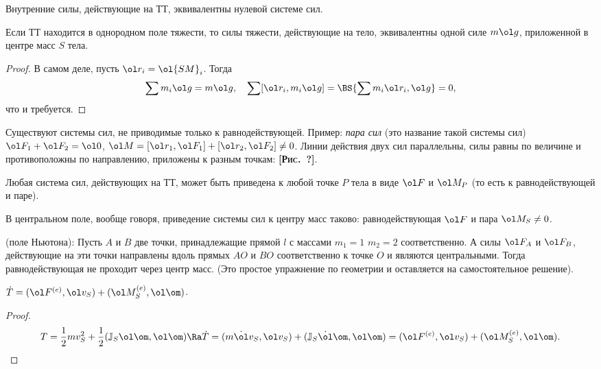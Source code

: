\documentclass[a4paper,12pt]{article}
\def\F{\ol F}
\def\w{\ol\om}
\def\r{\ol r}
\def\v{\ol v}
\def\JS{{\mathbb{J}_S}}
\def\d{\dot}
\def\pic#1{ \hbox{\textbf{\textsc{[Рис.~#1]}}}}
\begin{document}
\begin{note}
Внутренние силы, действующие на ТТ, эквивалентны нулевой системе сил.
\end{note}

\begin{lemma}
Если ТТ находится в однородном поле тяжести, то силы тяжести,
действующие на тело, эквивалентны одной силе $m\ol g$, приложенной в центре
масс $S$ тела.
\end{lemma}
\begin{proof}
В самом деле, пусть $\r_i=\ol{SM}_i$. Тогда
$$\sum m_i\ol g=m\ol g, \quad \sum[\r_i,m_i\ol g]= \BS{\sum m_i\r_i,\ol g} = 0,$$
что и требуется.
\end{proof}

\begin{note}
Существуют системы сил, не приводимые только к равнодействующей.
Пример: \emph{пара сил} (это название такой системы сил)
$\F_1+\F_2=\ol0$, $\ol M=[\r_1,\F_1]+[\r_2,\F_2]\ne0$.
Линии действия двух сил параллельны, силы равны по величине и
противоположны по направлению, приложены к разным точкам: \pic{?}.
\end{note}

\begin{note}
Любая система сил, действующих на ТТ, может быть приведена к
любой точке $P$ тела в виде $\F$ и $\ol M_P$ (то есть к равнодействующей и паре).
\end{note}

\begin{note}
В центральном поле, вообще говоря, приведение системы сил к
центру масс таково: равнодействующая $\F$ и пара $\ol M_S\ne0$.

\begin{ex} (поле Ньютона): Пусть $A$ и $B$ две точки,
принадлежащие прямой $l$ с массами $m_1=1$ $m_2=2$ соответственно. А
силы $\F_A$ и $\F_B$, действующие на эти точки направлены вдоль
прямых $AO$ и $BO$ соответственно к точке $O$ и являются
центральными. Тогда равнодействующая не проходит через центр масс.
(Это простое упражнение по геометрии и оставляется на
самостоятельное решение).
\end{ex}
\end{note}

\begin{theorem}
$\d T=(\F^{(e)}, \v_S)+(\ol M_S^{(e)},\w)$.
\end{theorem}

\begin{proof}
$$T =\frac12mv^2_S+\frac12(\JS\w,\w)\Ra\d T=
(m\d\v_S,\v_S)+(\JS\d\w,\w)=(\F^{(e)}, \v_S)+(\ol M_S^{(e)},\w).$$
\end{proof}
\end{document}
